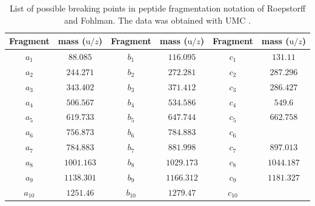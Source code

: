 \documentclass[a4paper,10pt]{article}
\begin{document}
\begin{appendices}
\begin{table}[htp!]
	\centering
	\caption{List of possible breaking points in peptide fragmentation notation of Roepstorff and Fohlman. The data was obtained with UMC \cite{umc}. }
	\begin{tabular}{c | c | c | c | c | c}
		Fragment & mass (${\mathrm{u}}/{z}$) & Fragment & mass (${\mathrm{u}}/{z}$) & Fragment & mass (${\mathrm{u}}/{z}$) \\ \hline
		$a_1$ & $88.085$ & $b_1$ & $116.095$ & $c_1$ & $131.11$ \\
		$a_2$ & $244.271$ & $b_2$ & $272.281$ & $c_2$ & $287.296$ \\
		$a_3$ & $343.402$ & $b_3$ & $371.412$ & $c_3$ & $286.427$ \\
		$a_4$ & $506.567$ & $b_4$ & $534.586$ & $c_4$ & $549.6$ \\
		$a_5$ & $619.733$ & $b_5$ & $647.744$ & $c_5$ & $662.758$ \\
		$a_6$ & $756.873$ & $b_6$ & $784.883$ & $c_6$ &  \\
		$a_7$ & $784.883$ & $b_7$ & $881.998$ & $c_7$ & $897.013$ \\
		$a_8$ & $1001.163$ & $b_8$ & $1029.173$ & $c_8$ & $1044.187$ \\
		$a_9$ & $1138.301$ & $b_9$ & $1166.312$ & $c_9$ & $1181.327$ \\
		$a_{10}$ & $1251.46$ & $b_{10}$ & $1279.47$ & $c_{10}$ &  \\
	\end{tabular}
	\label{tab_fragments}
\end{table}
\end{appendices}
\end{document}
